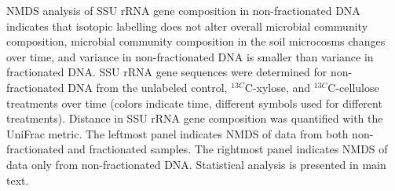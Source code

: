 NMDS analysis of SSU rRNA gene composition in non-fractionated DNA indicates
that isotopic labelling does not alter overall microbial community composition,
microbial community composition in the soil microcosms changes over time, and
variance in non-fractionated DNA is smaller than variance in fractionated DNA.
SSU rRNA gene sequences were determined for non-fractionated DNA from the
unlabeled control, $^{13C}$C-xylose, and $^{13C}$C-cellulose treatments over time (colors
indicate time, different symbols used for different treatments). Distance in SSU
rRNA gene composition was quantified with the UniFrac metric. The
leftmost panel indicates NMDS of data from both non-fractionated and
fractionated samples. The rightmost panel indicates NMDS of data only from
non-fractionated DNA. Statistical analysis is presented in main text.
